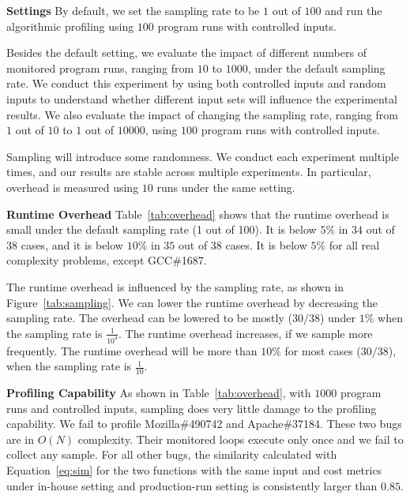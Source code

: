 



\noindent\textbf{Settings}
By default, we set the sampling rate to be $1$ out of $100$ 
and run the algorithmic profiling using $100$ program runs with controlled inputs.  

Besides the default setting,
we evaluate the impact of different numbers of monitored program runs, 
ranging from $10$ to $1000$, under the default sampling rate.
We conduct this experiment by using both controlled inputs and random inputs 
to understand whether different input sets will influence the experimental results.
We also evaluate the impact of changing the sampling rate, ranging from $1$ out of $10$ to $1$ out of $10000$, 
using $100$ program runs with controlled inputs.  

Sampling will introduce some randomness. 
We conduct each experiment multiple times, 
and our results are stable across multiple experiments. 
In particular, overhead is measured using $10$ runs under the same setting. 

\noindent\textbf{Runtime Overhead}
Table~\ref{tab:overhead} shows that the runtime overhead is small under the 
default sampling rate (1 out of 100).
It is below $5\%$ in $34$ out of $38$ cases, 
and it is below $10\%$ in $35$ out of $38$ cases. 
It is below $5\%$ for all real complexity problems, 
except GCC\#1687. 

The runtime overhead is influenced by the sampling rate, 
as shown in Figure~\ref{tab:sampling}.
We can lower the runtime overhead by decreasing the sampling rate.
The overhead can be lowered to be mostly ($30/38$) 
under $1\%$ when the sampling rate is $\frac{1}{10^4}$.
The runtime overhead increases, 
if we sample more frequently.
The runtime overhead will be more than $10\%$ for most cases ($30/38$), 
when the sampling rate is $\frac{1}{10}$.

\noindent\textbf{Profiling Capability}
As shown in Table~\ref{tab:overhead}, 
with $1000$ program runs and controlled inputs, 
sampling does very little damage to the profiling capability. 
We fail to profile Mozilla\#490742 and Apache\#37184.
These two bugs are in $O(N)$ complexity. 
Their monitored loops execute only once 
and we fail to collect any sample.
For all other bugs, 
the similarity calculated with Equation~\ref{eq:sim} for the two functions with the same input and cost metrics
under in-house setting and production-run setting is consistently larger than $0.85$.

